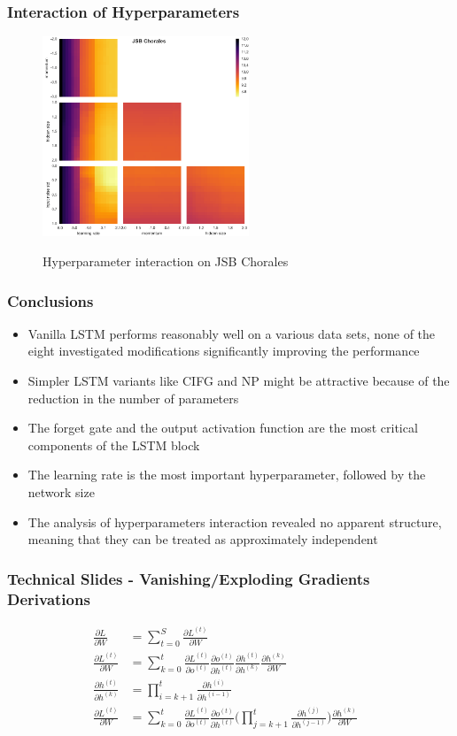 \documentclass{beamer}
\begin{document}
\begin{frame}
\frametitle{Interaction of Hyperparameters}
\begin{figure}
        {\includegraphics[width=0.55\textwidth]{jsb_variance.png}}
        \caption{Hyperparameter interaction on JSB Chorales}
    \end{figure}
\end{frame}

\begin{frame}
\frametitle{Conclusions}
\begin{itemize}
	\item Vanilla LSTM performs reasonably well on a various data sets, none of the eight investigated modifications significantly improving the performance
	\item Simpler LSTM variants like CIFG and NP might be attractive because of the reduction in the number of parameters
	\item The forget gate and the output activation function are the most critical components of the LSTM block
	\item The learning rate is the most important hyperparameter, followed by the network size
	\item The analysis of hyperparameters interaction revealed no apparent structure, meaning that they can be treated as approximately independent
\end{itemize}
\end{frame}

\begin{frame}
\frametitle{Technical Slides - Vanishing/Exploding Gradients Derivations}
	\begin{align*}
		\frac{\partial L}{\partial W} &= \sum_{t=0}^{S} \frac{\partial L^{(t)}}{\partial W}&\\
		\frac{\partial L^{(t)}}{\partial W} &= \sum_{k=0}^{t} \frac{\partial L^{(t)}}{\partial 		o^{(t)}} \frac{\partial o^{(t)}}{\partial h^{(t)}} \frac{\partial h^{(t)}}{\partial h^{(k)}} \frac{\partial h^{(k)}}{\partial W}&\\
		\frac{\partial h^{(t)}}{\partial h^{(k)}} &= \prod_{i=k+1}^{t} \frac{\partial h^{(i)}}{\partial h^{(i-1)}}&\\
		\frac{\partial L^{(t)}}{\partial W} &= \sum_{k=0}^{t} \frac{\partial L^{(t)}}{\partial o^{(t)}} \frac{\partial o^{(t)}}{\partial h^{(t)}} \bigg( \prod_{j=k+1}^t \frac{\partial h^{(j)}}{\partial h^{(j-1)}} \bigg) \frac{\partial h^{(k)}}{\partial W}&
	\end{align*}
\end{frame}
\end{document}
